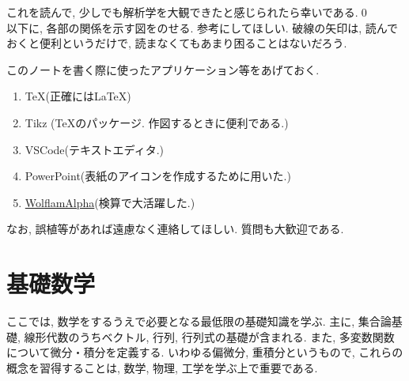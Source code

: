 \documentclass[a4j,dvipdfmx]{jsarticle}
\numberwithin{equation}{section}
\begin{document}
        これを読んで, 少しでも解析学を大観できたと感じられたら幸いである.\qed\\

        以下に, 各部の関係を示す図をのせる. 参考にしてほしい. 破線の矢印は, 読んでおくと便利というだけで, 読まなくてもあまり困ることはないだろう.
        \begin{figure}[h]
            \centering
        \end{figure}

        このノートを書く際に使ったアプリケーション等をあげておく.
        \begin{enumerate}
            \item \TeX (正確には\LaTeX)
            \item Tikz (\TeX のパッケージ. 作図するときに便利である.)
            \item VSCode(テキストエディタ.)
            \item PowerPoint(表紙のアイコンを作成するために用いた.)
            \item \href{https://www.wolframalpha.com/}{WolflamAlpha}(検算で大活躍した.)
        \end{enumerate}

        なお, 誤植等があれば遠慮なく連絡してほしい. 質問も大歓迎である.
    \clearpage
    \label{目次}
    \tableofcontents
    \clearpage

    \part{基礎数学}
    \begin{screen}
        ここでは, 数学をするうえで必要となる最低限の基礎知識を学ぶ. 主に, 集合論基礎, 線形代数のうちベクトル, 行列, 行列式の基礎が含まれる.
        また, 多変数関数について微分・積分を定義する. いわゆる偏微分, 重積分というもので, これらの概念を習得することは, 数学, 物理, 工学を学ぶ上で重要である.
    \end{screen}
    \clearpage
\end{document}
